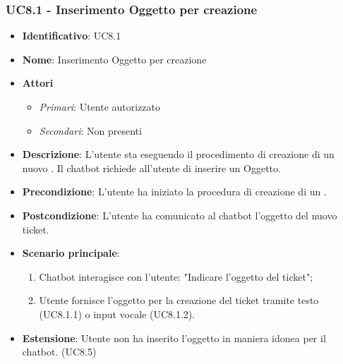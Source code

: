 \subsubsection{UC8.1 - Inserimento Oggetto per creazione }
\begin{itemize}
	\item \textbf{Identificativo}: UC8.1
	\item \textbf{Nome}: Inserimento Oggetto per creazione  
	\item \textbf{Attori}
	\begin{itemize} 
		\item \textit{Primari}: Utente autorizzato
		\item \textit{Secondari}: Non presenti
	\end{itemize}
	\item \textbf{Descrizione}: L'utente sta eseguendo il procedimento di creazione di un nuovo . Il chatbot richiede all'utente di inserire un Oggetto. 
	\item \textbf{Precondizione}: L'utente ha iniziato la procedura di creazione di un .
	\item \textbf{Postcondizione}: L'utente ha comunicato al chatbot l'oggetto del nuovo ticket.
	\item \textbf{Scenario principale}: \begin{enumerate}
		\item Chatbot interagisce con l'utente: "Indicare l'oggetto del ticket";
		\item Utente fornisce l'oggetto per la creazione del ticket tramite testo (UC8.1.1) o input vocale (UC8.1.2). 
	\end{enumerate}
	\item \textbf{Estensione}: Utente non ha inserito l'oggetto in maniera idonea per il chatbot. (UC8.5)
		
\end{itemize}

